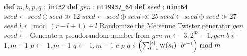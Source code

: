 \documentclass {article}
\begin{document}
	\begin{algorithmic}[1]
		\State \textbf{def} $m, b, p, q$ : \texttt{int32}
		\State \textbf{def} $gen$ : \texttt{mt19937\_64}
		\State \textbf{def} $seed$ : \texttt{uint64}
		\State
		 {{}}
			\State $seed \gets seed \oplus seed \gg 12$
			\State $seed \gets seed \oplus seed \ll 25$
			\State $seed \gets seed \oplus seed \gg 27$
			\State \Return $seed$
		\EndFunction
		\State
		 {$l, r$}
			\State \Return {} {{}} $\bmod \left( r - l + 1 \right) + l$
		\EndFunction
		\State
		 {{}}
			\State Randomize the Mersenne Twister generator $gen$
			\State $seed \gets$ Generate a pseudorandom number from $gen$
			\Repeat
				\State $m \gets$  {$3, 2^{63} - 1, gen$}
				\State {} {{}}
			\EndFor
			\State $b \gets$  {$1, m - 1$}
			\State $p \gets$  {$1, m - 1$}
			\State $q \gets$  {$1, m - 1$}
		\EndProcedure
		\State
		 {$c$}
				\State \Return $p$
			\Else
				\State \Return $q$
			\EndIf
		\EndFunction
		\State
		 {$s$}
			\State \Return $\left( \sum_{i=1}^{\left| s \right|} \Call {w} {s_i} \cdot b^{i-1} \right) \bmod m$
		\EndFunction
	\end{algorithmic}
\end{document}
